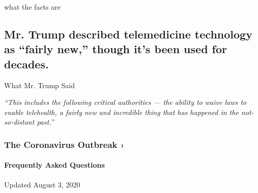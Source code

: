 what the facts are

\hypertarget{mr-trump-described-telemedicine-technology-as-fairly-new-though-its-been-used-for-decades}{%
\subsection{Mr. Trump described telemedicine technology as ``fairly
new,'' though it's been used for
decades.}\label{mr-trump-described-telemedicine-technology-as-fairly-new-though-its-been-used-for-decades}}

What Mr. Trump Said

\emph{``This includes the following critical authorities --- the ability
to waive laws to enable telehealth, a fairly new and incredible thing
that has happened in the not-so-distant past.''}

\href{https://www.nytimes3xbfgragh.onion/news-event/coronavirus?action=click\&pgtype=Article\&state=default\&region=MAIN_CONTENT_3\&context=storylines_faq}{}

\hypertarget{the-coronavirus-outbreak-}{%
\subsubsection{The Coronavirus Outbreak
›}\label{the-coronavirus-outbreak-}}

\hypertarget{frequently-asked-questions}{%
\paragraph{Frequently Asked
Questions}\label{frequently-asked-questions}}

Updated August 3, 2020


